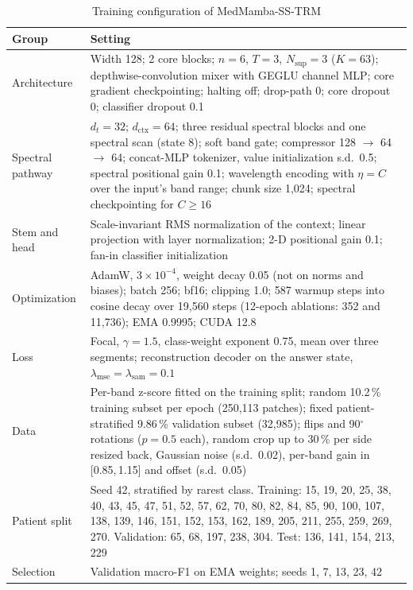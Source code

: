 \documentclass{svproc}
\begin{document}
\begin{table}[!htb]
\caption{Training configuration of MedMamba-SS-TRM}
\label{tab:config}
\centering\scriptsize
\begin{tabular}{@{}L{1.8cm}L{9.5cm}@{}}
\toprule
Group & Setting \\
\midrule
Architecture & Width 128; 2 core blocks; $n = 6$, $T = 3$, $N_{\text{sup}} = 3$ ($K = 63$); depthwise-convolution mixer with GEGLU channel MLP; core gradient checkpointing; halting off; drop-path 0; core dropout 0; classifier dropout 0.1 \\
Spectral pathway & $d_t = 32$; $d_{\text{ctx}} = 64$; three residual spectral blocks and one spectral scan (state 8); soft band gate; compressor 128 $\to$ 64 $\to$ 64; concat-MLP tokenizer, value initialization s.d.\ 0.5; spectral positional gain 0.1; wavelength encoding with $\eta = C$ over the input's band range; chunk size 1,024; spectral checkpointing for $C \geq 16$ \\
Stem and head & Scale-invariant RMS normalization of the context; linear projection with layer normalization; 2-D positional gain 0.1; fan-in classifier initialization \\
Optimization & AdamW, $3 \times 10^{-4}$, weight decay 0.05 (not on norms and biases); batch 256; bf16; clipping 1.0; 587 warmup steps into cosine decay over 19,560 steps (12-epoch ablations: 352 and 11,736); EMA 0.9995; CUDA 12.8 \\
Loss & Focal, $\gamma = 1.5$, class-weight exponent 0.75, mean over three segments; reconstruction decoder on the answer state, $\lambda_{\text{mse}} = \lambda_{\text{sam}} = 0.1$ \\
Data & Per-band z-score fitted on the training split; random 10.2\,\% training subset per epoch (250,113 patches); fixed patient-stratified 9.86\,\% validation subset (32,985); flips and 90$^\circ$ rotations ($p = 0.5$ each), random crop up to 30\,\% per side resized back, Gaussian noise (s.d.\ 0.02), per-band gain in [0.85,\,1.15] and offset (s.d.\ 0.05) \\
Patient split & Seed 42, stratified by rarest class. Training: 15, 19, 20, 25, 38, 40, 43, 45, 47, 51, 52, 57, 62, 70, 80, 82, 84, 85, 90, 100, 107, 138, 139, 146, 151, 152, 153, 162, 189, 205, 211, 255, 259, 269, 270. Validation: 65, 68, 197, 238, 304. Test: 136, 141, 154, 213, 229 \\
Selection & Validation macro-F1 on EMA weights; seeds 1, 7, 13, 23, 42 \\
\bottomrule
\end{tabular}
\end{table}
\end{document}
